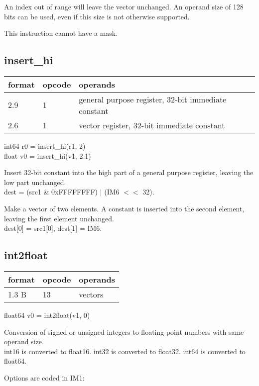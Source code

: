 \documentclass[forwardcom.tex]{subfiles}
\begin{document}
An index out of range will leave the vector unchanged. An operand size of 128 bits can be used, even if this size is not otherwise supported.
\vv

This instruction cannot have a mask.
\vv

\subsection{insert\_hi}
\label{table:insertHiInstruction}
\begin{tabular}{|p{12mm}|p{15mm}|p{100mm}|}
\hline
\bfseries format & \bfseries opcode & \bfseries operands \\ \hline
2.9 & 1 & general purpose register, 32-bit immediate constant \\ \hline
2.6 & 1 & vector register, 32-bit immediate constant \\ \hline
\end{tabular}
\vv

int64 r0 = insert\_hi(r1, 2) \\
float v0 = insert\_hi(v1, 2.1)
\vv

Insert 32-bit constant into the high part of a
general purpose register, leaving the low part
unchanged. \\
dest = (src1 \& 0xFFFFFFFF) $|$ (IM6 $<<$ 32).
\vv

Make a vector of two elements. A constant is inserted into the second element, leaving the first element unchanged.\\
dest[0] = src1[0], dest[1] = IM6.
\vv


\subsection{int2float}
\label{table:int2floatInstruction}
\begin{tabular}{|p{12mm}|p{15mm}|p{100mm}|}
\hline
\bfseries format & \bfseries opcode & \bfseries operands \\ \hline
1.3 B & 13 & vectors \\ \hline
\end{tabular}
\vv

float64 v0 = int2float(v1, 0)
\vv

Conversion of signed or unsigned integers to floating point numbers with same operand size.\\
int16 is converted to float16. int32 is converted to float32. int64 is converted to float64.
\vv

Options are coded in IM1:
\end{document}
